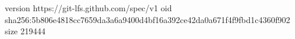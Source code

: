 version https://git-lfs.github.com/spec/v1
oid sha256:5b806e4818cc7659da3a6a9400d4bf16a392ce42da0a671f4f9fbd1c4360f902
size 219444
